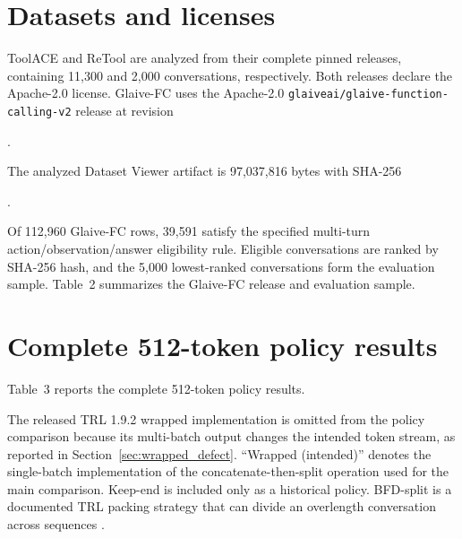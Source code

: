 \documentclass[pdflatex,sn-basic,Numbered]{sn-jnl}
\begin{document}
\begin{appendices}
\section{Datasets and licenses}

ToolACE and ReTool are analyzed from their complete pinned releases, containing 11,300 and
2,000 conversations, respectively. Both releases declare the Apache-2.0 license. Glaive-FC uses
the Apache-2.0 \texttt{glaiveai/glaive-function-calling-v2} release at revision

{\footnotesize\ttfamily
{}}.

The analyzed Dataset Viewer artifact is 97,037,816 bytes with SHA-256

{\footnotesize\ttfamily
{}}.

Of 112,960 Glaive-FC rows, 39,591 satisfy the specified multi-turn
action/observation/answer eligibility rule. Eligible conversations are ranked by SHA-256 hash,
and the 5,000 lowest-ranked conversations form the evaluation sample. Table~2 summarizes the Glaive-FC release and evaluation sample.

\begin{table}[ht]
\centering
\caption{
Glaive-FC dataset and sampling summary. Full revision and content hashes are included in the
machine-readable manifest.
}
\resizebox{\textwidth}{!}{}
\end{table}


\section{Complete 512-token policy results}

Table~3 reports the complete 512-token policy results.
\begin{table}[ht]
\centering
\caption{
Complete 512-token results for the evaluated sequence policies. Separation rate is calculated
among retained matched targets. Affected assistant tokens are source-separated target-value
tokens divided by the original assistant loss-token count.
}
\resizebox{\textwidth}{!}{}
\end{table}

The released TRL 1.9.2 wrapped implementation is omitted from the policy comparison because its
multi-batch output changes the intended token stream, as reported in
Section~\ref{sec:wrapped_defect}. ``Wrapped (intended)'' denotes the single-batch implementation
of the concatenate-then-split operation used for the main comparison. Keep-end is included only
as a historical policy. BFD-split is a documented TRL packing strategy that can divide an
overlength conversation across sequences \citep{huggingface2026sft}.



\end{appendices}
\end{document}
